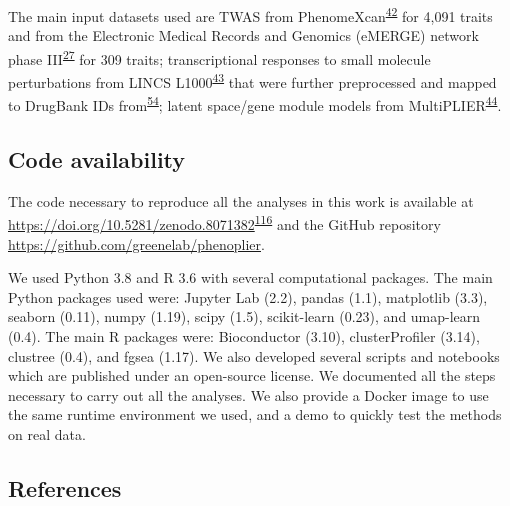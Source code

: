 \documentclass[
  a4paper,
]{article}
\begin{document}
The main input datasets used are TWAS from PhenomeXcan\textsuperscript{\protect\hyperlink{ref-lY5ln3dB}{42}} for 4,091 traits and from the Electronic Medical Records and Genomics (eMERGE) network phase III\textsuperscript{\protect\hyperlink{ref-gZAOkumx}{27}} for 309 traits;
transcriptional responses to small molecule perturbations from LINCS L1000\textsuperscript{\protect\hyperlink{ref-F7lIlh2N}{43}} that were further preprocessed and mapped to DrugBank IDs from\textsuperscript{\protect\hyperlink{ref-1DJZvtwP1}{54}};
latent space/gene module models from MultiPLIER\textsuperscript{\protect\hyperlink{ref-14rnBunuZ}{44}}.

\hypertarget{code-availability}{%
\subsection{Code availability}\label{code-availability}}

The code necessary to reproduce all the analyses in this work is available at \url{https://doi.org/10.5281/zenodo.8071382}\textsuperscript{\protect\hyperlink{ref-cygmsEBt}{116}} and the GitHub repository \url{https://github.com/greenelab/phenoplier}.

We used Python 3.8 and R 3.6 with several computational packages.
The main Python packages used were: Jupyter Lab (2.2), pandas (1.1), matplotlib (3.3), seaborn (0.11), numpy (1.19), scipy (1.5), scikit-learn (0.23), and umap-learn (0.4).
The main R packages were: Bioconductor (3.10), clusterProfiler (3.14), clustree (0.4), and fgsea (1.17).
We also developed several scripts and notebooks which are published under an open-source license.
We documented all the steps necessary to carry out all the analyses.
We also provide a Docker image to use the same runtime environment we used, and a demo to quickly test the methods on real data.

\hypertarget{references}{%
\subsection{References}\label{references}}
\end{document}
